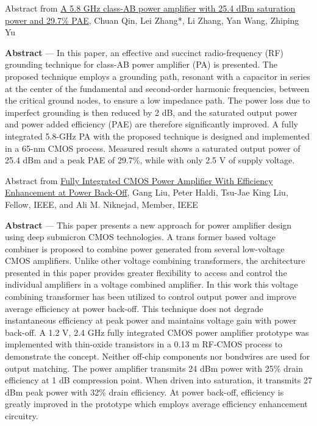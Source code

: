 \documentclass{article}
\begin{document}

Abstract from \href{https://www.sciengine.com/SCIS/doi/10.1007/s11432-016-0299-4?&trans=true}{A 5.8 GHz class-AB power amplifier with 25.4 dBm saturation power and 29.7\% PAE}, Chuan Qin,  Lei Zhang*,  Li Zhang,  Yan Wang,  Zhiping Yu

\begin{info}
	\textbf{Abstract} — In this paper, an effective and succinct radio-frequency (RF) grounding technique for class-AB power amplifier (PA) is presented. The proposed technique employs a grounding path, resonant with a capacitor in series at the center of the fundamental and second-order harmonic frequencies, between the critical ground nodes, to ensure a low impedance path. The power loss due to imperfect grounding is then reduced by 2 dB, and the saturated output power and power added efficiency (PAE) are therefore significantly improved. A fully integrated 5.8-GHz PA with the proposed technique is designed and implemented in a 65-nm CMOS process. Measured result shows a saturated output power of 25.4 dBm and a peak PAE of 29.7\%, while with only 2.5 V of supply voltage.
\end{info}


Abstract from \href{https://ieeexplore.ieee.org/document/4456783}{Fully Integrated CMOS Power Amplifier With Efficiency Enhancement at Power Back-Off}, Gang Liu, Peter Haldi, Tsu-Jae King Liu, Fellow, IEEE, and Ali M. Niknejad, Member, IEEE

\begin{info}
	\textbf{Abstract} — This paper presents a new approach for power amplifier design using deep submicron CMOS technologies. A trans former based voltage combiner is proposed to combine power generated from several low-voltage CMOS amplifiers. Unlike other voltage combining transformers, the architecture presented in this paper provides greater flexibility to access and control the individual amplifiers in a voltage combined amplifier. In this work this voltage combining transformer has been utilized to control output power and improve average efficiency at power back-off. This technique does not degrade instantaneous efficiency at peak power and maintains voltage gain with power back-off. A 1.2 V, 2.4 GHz fully integrated CMOS power amplifier prototype was implemented with thin-oxide transistors in a 0.13 m RF-CMOS process to demonstrate the concept. Neither off-chip components nor bondwires are used for output matching. The power amplifier transmits 24 dBm power with 25\% drain efficiency at 1 dB compression point. When driven into saturation, it transmits 27 dBm peak power with 32\% drain efficiency. At power back-off, efficiency is greatly improved in the prototype which employs average efficiency enhancement circuitry.
\end{info}
\end{document}
